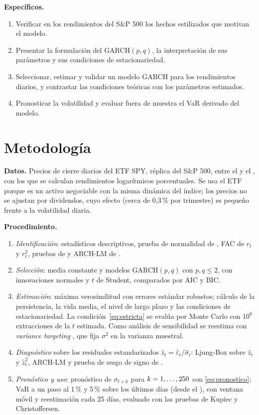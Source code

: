 \documentclass[legalpaper,11pt]{article}
\begin{document}
\textbf{Específicos.}
\begin{enumerate}[label=\arabic*.]
  \item Verificar en los rendimientos del S\&P 500 los hechos estilizados que motivan el modelo.
  \item Presentar la formulación del GARCH$(p,q)$, la interpretación de sus parámetros y sus
  condiciones de estacionariedad.
  \item Seleccionar, estimar y validar un modelo GARCH para los rendimientos diarios, y
  contrastar las condiciones teóricas con los parámetros estimados.
  \item Pronosticar la volatilidad y evaluar fuera de muestra el VaR derivado del modelo.
\end{enumerate}

\section{Metodología}

\textbf{Datos.} Precios de cierre diarios del ETF SPY, réplica del S\&P 500, entre el
\gFechaIni{} y el \gFechaFin{} \citep{twelvedata}, con los que se calculan \gN{} rendimientos
logarítmicos porcentuales. Se usa el ETF porque es un activo negociable con la misma dinámica
del índice; los precios no se ajustan por dividendos, cuyo efecto (cerca de 0,3\,\% por
trimestre) es pequeño frente a la volatilidad diaria.

\textbf{Procedimiento.}
\begin{enumerate}[label=\arabic*.]
  \item \emph{Identificación}: estadísticos descriptivos, prueba de normalidad de
  \citet{jarque1980}, FAC de $r_t$ y $r_t^2$, pruebas de \citet{ljung1978} y ARCH-LM de
  \citet{engle1982}.
  \item \emph{Selección}: media constante y modelos GARCH$(p,q)$ con $p,q\le 2$, con
  innovaciones normales y $t$ de Student, comparados por AIC y BIC.
  \item \emph{Estimación}: máxima verosimilitud con errores estándar robustos;
  cálculo de la persistencia, la vida media, el nivel de largo plazo y las condiciones de
  estacionariedad. La condición~\eqref{eq:estricta} se evalúa por Monte Carlo con $10^6$
  extracciones de la $t$ estimada. Como análisis de sensibilidad se reestima con
  \emph{variance targeting} \citep{engle1996}, que fija $\sigma^2$ en la varianza muestral.
  \item \emph{Diagnóstico} sobre los residuales estandarizados $\hat z_t=\hat\varepsilon_t/\hat\sigma_t$:
  Ljung-Box sobre $\hat z_t$ y $\hat z_t^2$, ARCH-LM y prueba de sesgo de signo de
  \citet{engle1993}.
  \item \emph{Pronóstico y uso}: pronóstico de $\sigma_{t+k}$ para $k=1,\dots,250$ con
  \eqref{eq:pronostico}; VaR a un paso al 1\,\% y 5\,\% sobre los últimos \gOosN{} días
  (desde el \gOosIni), con ventana móvil y reestimación cada 25 días, evaluado con las
  pruebas de Kupiec y Christoffersen.
\end{enumerate}
\end{document}
